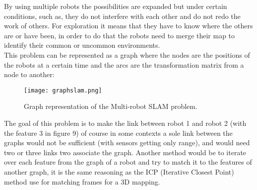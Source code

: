 By using multiple robots the possibilities are expanded but under certain conditions, such as, they do not interfere with each other and do not redo the work of others. For exploration it means that they have to know where the others are or have been, in order to do that the robots need to merge their map to identify their common or uncommon environments.\\
This problem can be represented as a graph where the nodes are the positions of the robots at a certain time and the arcs are the transformation matrix from a node to another:

\begin{figure}[H]
\centering
    \texttt{[image: graphslam.png]} 
    \caption{Graph representation of the Multi-robot SLAM problem.}
    \label{fig:difalgo}
\end{figure}

The goal of this problem is to make the link between robot 1 and robot 2 (with the feature 3 in figure 9) of course in some contexts a sole link between the graphs would not be sufficient (with sensors getting only range), and would need two or three links two associate the graph.
Another method would be to iterate over each feature from the graph of a robot and try to match it to the features of another graph, it is the same reasoning as the ICP (Iterative Closest Point) method use for matching frames for a 3D mapping.
